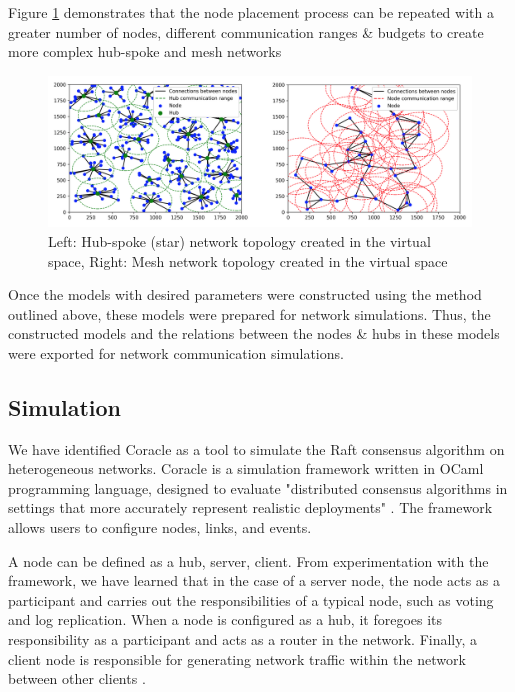 Figure \ref{fig:modeling_complex} demonstrates that the node placement process can be repeated with a greater number of nodes, different communication ranges \& budgets to create more complex hub-spoke and mesh networks
\begin{figure}[H]
    \centering
    \includegraphics[width=0.94\columnwidth]{final-proposal/images/modeling_complex_unified.png}
    \caption{Left: Hub-spoke (star) network topology created in the virtual space, Right: Mesh network topology created in the virtual space}
    \label{fig:modeling_complex}
\end{figure}

Once the models with desired parameters were constructed using the method outlined above, these models were prepared for network simulations. Thus, the constructed models and the relations between the nodes \& hubs in these models were exported for network communication simulations.




\subsection{Simulation}
We have identified Coracle \cite{Coracle} as a tool to simulate the Raft consensus algorithm on heterogeneous networks. Coracle is a simulation framework written in OCaml programming language, designed to evaluate "distributed consensus algorithms in settings that more accurately represent realistic deployments" \cite{howardCoracleEvaluatingConsensus2015}. The framework allows users to configure nodes, links, and events. 

A node can be defined as a hub, server, client. From experimentation with the framework, we have learned that in the case of a server node, the node acts as a participant and carries out the responsibilities of a typical node, such as voting and log replication. When a node is configured as a hub, it foregoes its responsibility as a participant and acts as a router in the network. Finally, a client node is responsible for generating network traffic within the network between other clients \cite{howardCoracleEvaluatingConsensus2015}.

